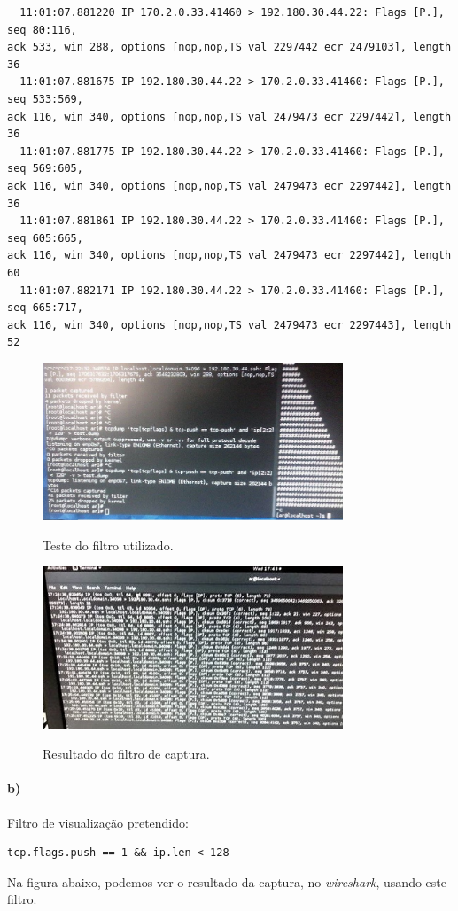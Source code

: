 \begin{verbatim}
  11:01:07.881220 IP 170.2.0.33.41460 > 192.180.30.44.22: Flags [P.], seq 80:116, 
ack 533, win 288, options [nop,nop,TS val 2297442 ecr 2479103], length 36
  11:01:07.881675 IP 192.180.30.44.22 > 170.2.0.33.41460: Flags [P.], seq 533:569, 
ack 116, win 340, options [nop,nop,TS val 2479473 ecr 2297442], length 36
  11:01:07.881775 IP 192.180.30.44.22 > 170.2.0.33.41460: Flags [P.], seq 569:605, 
ack 116, win 340, options [nop,nop,TS val 2479473 ecr 2297442], length 36
  11:01:07.881861 IP 192.180.30.44.22 > 170.2.0.33.41460: Flags [P.], seq 605:665, 
ack 116, win 340, options [nop,nop,TS val 2479473 ecr 2297442], length 60
  11:01:07.882171 IP 192.180.30.44.22 > 170.2.0.33.41460: Flags [P.], seq 665:717, 
ack 116, win 340, options [nop,nop,TS val 2479473 ecr 2297443], length 52
\end{verbatim}

\begin{figure}[h]
\centering
\includegraphics[width=0.8\textwidth]{3_a_filtro.png}
\label{fig:filtro}
\caption{Teste do filtro utilizado.}
\end{figure}

\begin{figure}[h]
\centering
\includegraphics[width=0.8\textwidth]{3_a_resultado_do_tcpdump.png}
\label{fig:tcpdump}
\caption{Resultado do filtro de captura.}
\end{figure}
\newpage
\paragraph{b)}
Filtro de visualização pretendido:
\begin{verbatim}
tcp.flags.push == 1 && ip.len < 128
\end{verbatim}
Na figura abaixo, podemos ver o resultado da captura, no \emph{wireshark}, usando este filtro.

